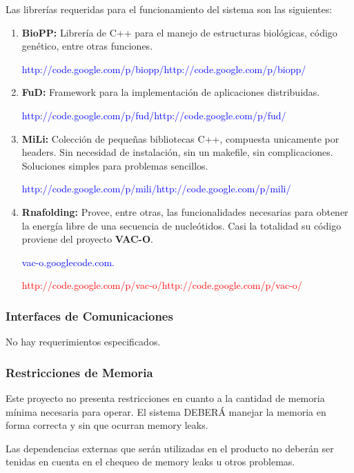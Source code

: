 \documentclass[12pt,a4paper,spanish]{article}
\begin{document}
		\par Las librerías requeridas para el funcionamiento del sistema son las siguientes:
		\begin{enumerate}
			\item \textbf{BioPP:} Librería de C++ para el manejo de estructuras biológicas, código
						genético, entre otras funciones. 
						\par \noindent \textcolor{blue}{http://code.google.com/p/biopp/http://code.google.com/p/biopp/}

			\item \textbf{FuD:} Framework para la implementación de aplicaciones distribuidas. 
						\par \noindent \textcolor{blue}{http://code.google.com/p/fud/http://code.google.com/p/fud/}

			\item \textbf{MiLi:} Colección de pequeñas bibliotecas C++, compuesta unicamente por headers. Sin necesidad de instalación, sin un 									makefile, sin complicaciones. Soluciones simples para problemas sencillos.
						\par \noindent \textcolor{blue}{http://code.google.com/p/mili/http://code.google.com/p/mili/}

			\item \textbf{Rnafolding:} Provee, entre otras, las funcionalidades necesarias para obtener la energía libre de una secuencia de nucleótidos.
									   Casi la totalidad su código proviene del proyecto \textbf{VAC-O}.
						\par \noindent \textcolor{blue}{vac-o.googlecode.com.}
						\par \noindent \textcolor{red}{http://code.google.com/p/vac-o/http://code.google.com/p/vac-o/}  
		\end{enumerate}

	\subsubsection{Interfaces de Comunicaciones}
		No hay requerimientos especificados.

	\subsubsection{Restricciones de Memoria}	
		\par Este proyecto no presenta restricciones en cuanto a la cantidad de memoria mínima necesaria para operar. El sistema DEBERÁ manejar la memoria 			en forma correcta y sin que ocurran memory leaks.
		\par Las dependencias externas que serán utilizadas en el producto no deberán ser tenidas en cuenta en el chequeo 
		de memory leaks u otros problemas.
		
\end{document}
